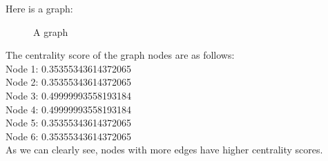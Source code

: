 \documentclass{article}
\begin{document}
    \noindent Here is a graph:
    \begin{figure}[ht]
        \centering
            \caption{A graph}
            \label{fig:graph2}
        \end{figure}

    \noindent The centrality score of the graph nodes are as follows: \\
    Node 1: 0.35355343614372065\\
    Node 2: 0.35355343614372065\\
    Node 3: 0.49999993558193184\\
    Node 4: 0.49999993558193184\\
    Node 5: 0.35355343614372065\\
    Node 6: 0.35355343614372065\\

    As we can clearly see, nodes with more edges have higher centrality scores.
\end{document}
